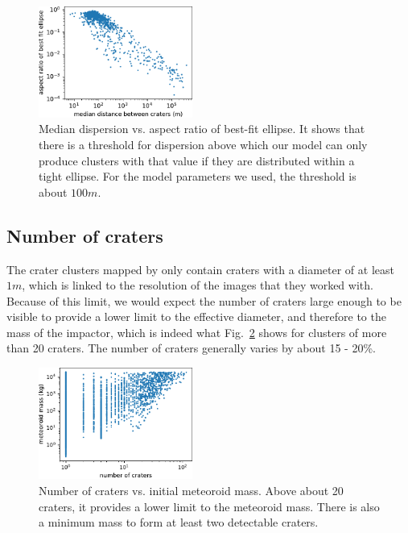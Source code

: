 \begin{figure}[htbp]
    \centering
    \includegraphics[width=0.45\textwidth]{figures/disp_vs_aspect}
    \caption{Median dispersion vs. aspect ratio of best-fit ellipse. It shows that there is a threshold for dispersion above which our model can only produce clusters with that value if they are distributed within a tight ellipse. For the model parameters we used, the threshold is about $100\unit{m}$.}
    \label{fig:disp_vs_aspect}
\end{figure}

\subsection{Number of craters}
The crater clusters mapped by \cite{daubar2019recently} only contain craters with a diameter of at least $1\unit{m}$, which is linked to the resolution of the images that they worked with.
Because of this limit, we would expect the number of craters large enough to be visible to provide a lower limit to the effective diameter, and therefore to the mass of the impactor, which is indeed what Fig.~\ref{fig:n_craters_vs_m} shows for clusters of more than 20 craters.
The number of craters generally varies by about 15 - 20\%.

\begin{figure}[htbp]
    \centering
    \includegraphics[width=0.45\textwidth]{figures/n_craters_vs_mass}
    \caption{Number of craters vs. initial meteoroid mass. Above about 20 craters, it provides a lower limit to the meteoroid mass. There is also a minimum mass to form at least two detectable craters.}
    \label{fig:n_craters_vs_m}
\end{figure}

